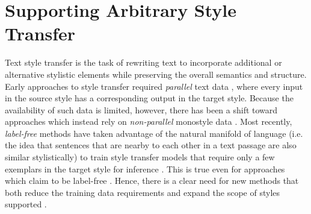\section{Supporting Arbitrary Style Transfer}
\label{section:style_transfer}

Text style transfer is the task of rewriting text to incorporate additional or alternative stylistic elements while preserving the overall semantics and structure.
Early approaches to style transfer required \textit{parallel} text data \citep{zhu-etal-2010-monolingual,rao-tetreault-2018-dear}, where every input in the source style has a corresponding output in the target style.
Because the availability of such data is limited, however, there has been a shift toward approaches which instead rely on \textit{non-parallel} monostyle data \cite{li-etal-2018-delete,jin-etal-2019-imat, liu2020revision,style-transfer-as-paraphrase-2020}.
Most recently, \textit{label-free} methods have taken advantage of the natural manifold of language (i.e. the idea that sentences that are nearby to each other in a text passage are also similar stylistically) to train style transfer models that require only a few exemplars in the target style for inference \citep{DBLP:journals/corr/abs-1905-11975, DBLP:journals/corr/abs-2010-03802}.
This is true even for approaches which claim to be label-free \citep{DBLP:journals/corr/abs-1905-11975,DBLP:journals/corr/abs-2010-03802}.
Hence, there is a clear need for new methods that both reduce the training data requirements and expand the scope of styles supported \citep{DBLP:journals/corr/abs-2011-00416,DBLP:journals/corr/abs-2010-12742}.

